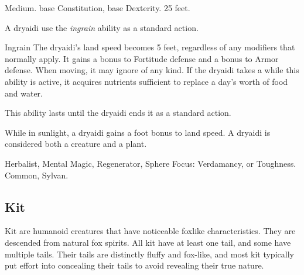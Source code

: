          Medium.
          base Constitution,  base Dexterity.
         25 feet.
        \begin{itemize}
             A dryaidi use the \textit{ingrain} ability as a standard action.
                \begin{freeability}{Ingrain}
                    The dryaidi's land speed becomes 5 feet, regardless of any modifiers that normally apply.
                    It gains a  bonus to Fortitude defense and a  bonus to Armor defense.
                    When moving, it may ignore  of any kind.
                    If the dryaidi takes a  while this ability is active, it acquires nutrients sufficient to replace a day's worth of food and water.

                    This ability lasts until the dryaidi ends it as a standard action.
                \end{freeability}
             While in sunlight, a dryaidi gains a  foot bonus to land speed.
             A dryaidi is considered both a creature and a plant.
        \end{itemize}
         Herbalist, Mental Magic, Regenerator, Sphere Focus: Verdamancy, or Toughness.
         Common, Sylvan.

    \subsection{Kit}

        Kit are humanoid creatures that have noticeable foxlike characteristics.
        They are descended from natural fox spirits.
        All kit have at least one tail, and some have multiple tails.
        Their tails are distinctly fluffy and fox-like, and most kit typically put effort into concealing their tails to avoid revealing their true nature.

